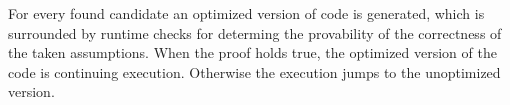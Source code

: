 For every found candidate an optimized version of code is generated, which is surrounded by runtime checks for determing the provability of the correctness of the taken assumptions.
When the proof holds true, the optimized version of the code is continuing execution.
Otherwise the execution jumps to the unoptimized version.

